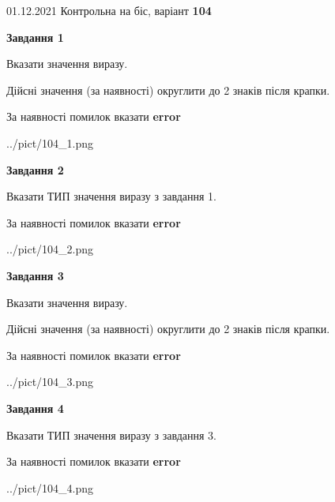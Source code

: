 \documentclass[11pt, ukrainian]{article}
\begin{document}
{01.12.2021 Контрольна на біс, варіант  \No \textbf { 104 }\par}
{
\begin {large}
{\begin {center}\textbf{Завдання 1}\end {center}}\par
Вказати значення виразу. \par
Дійсні значення (за наявності) округлити до 2 знаків після крапки. \par
За наявності помилок вказати \textbf{error}

\begin{center}
	{../pict/104_1.png}
\end{center}
\newpage

{\begin {center}\textbf{Завдання 2}\end {center}}\par
Вказати ТИП значення виразу з завдання 1. \par
За наявності помилок вказати \textbf{error}

\begin{center}
	{../pict/104_2.png}
\end{center}
\newpage

{\begin {center}\textbf{Завдання 3}\end {center}}\par
Вказати значення виразу. \par
Дійсні значення (за наявності) округлити до 2 знаків після крапки. \par
За наявності помилок вказати \textbf{error}

\begin{center}
	{../pict/104_3.png}
\end{center}
\newpage

{\begin {center}\textbf{Завдання 4}\end {center}}\par
Вказати ТИП значення виразу з завдання 3. \par
За наявності помилок вказати \textbf{error}

\begin{center}
	{../pict/104_4.png}
\end{center}
\newpage


\end{large}}
\end{document}
